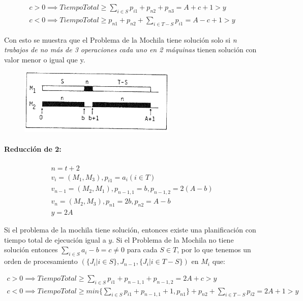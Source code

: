 \documentclass[11pt, a4paper,spanish]{article}
\begin{document}
					\begin{gather}
						c > 0 \implies  TiempoTotal \geq \sum_{i\in S}p_{i1} + p_{n2} + p_{n3} = A + c + 1 > y\\ 
						c < 0 \implies  TiempoTotal \geq  p_{n1} + p_{n2}  + \sum_{i\in T-S}p_{i1} = A - c + 1 > y
					\end{gather}
					
					Con esto se muestra que el Problema de la Mochila tiene solución solo si \textit{ n trabajos de no más de 3 operaciones cada uno en 2 máquinas} tienen solución con valor menor o igual que y.
	
					\begin{figure}[H]
						\centering
						\includegraphics[width=75mm]{res/example1.png}
					\end{figure}
	
				\paragraph{Reducción de 2:}

					\begin{gather}
						n = t + 2 \\
						v_{i} = (M_{1}, M_{3}), p_{i1} = a_{i} (i \in T) \\
						v_{n-1} = (M_{2}, M_{1}), p_{n-1,1} = b,  p_{n-1,2} = 2(A-b) \\
						v_{n} = (M_{2}, M_{3}), p_{n1} = 2b,  p_{n2} = A-b \\
						y = 2A
					\end{gather}
					
					Si el problema de la mochila tiene solución, entonces existe una planificación con tiempo total de ejecución igual a $y$. Si el Problema de la Mochila no tiene solución entonces  $\sum_{i\in S}a_{i} - b = c \neq 0$ para cada  $S \in T$, por lo que tenemos un orden de procesamiento $( \{J_{i} | i \in S\},J_{n-1} , \{J_{i} | i \in T-S\})$ en $M_{i}$ que:

					\begin{gather}
						c > 0 \implies  TiempoTotal \geq \sum_{i\in S}p_{i1} + p_{n-1,1} + p_{n-1, 2} = 2A + c > y\\ 
						c < 0 \implies  TiempoTotal \geq  min\{ \sum_{i\in S}p_{i1} +p_{n-1,1}+1,p_{n1} \}+ p_{n2}  + \sum_{i\in T-S}p_{i2} = 2A + 1 > y
					\end{gather}
					
\end{document}
